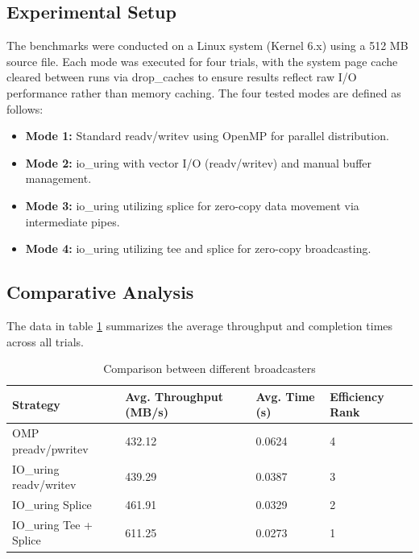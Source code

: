 \documentclass[
	a4paper,
	10pt,
	unnumberedsections,
	twoside, 
]{LTJournalArticle}
\begin{document}
\subsection{Experimental Setup}
The benchmarks were conducted on a Linux system (Kernel 6.x) using a 512 MB source file. Each mode was executed for four trials, with the system page cache cleared between runs via drop\_caches to ensure results reflect raw I/O performance rather than memory caching. The four tested modes are defined as follows:
\begin{itemize}
\item \textbf{Mode 1:} Standard readv/writev using OpenMP for parallel distribution.
\item \textbf{Mode 2:} io\_uring with vector I/O (readv/writev) and manual buffer management.
\item \textbf{Mode 3:} io\_uring utilizing splice for zero-copy data movement via intermediate pipes.
\item \textbf{Mode 4:} io\_uring utilizing tee and splice for zero-copy broadcasting.
\end{itemize}

\subsection{Comparative Analysis}
The data in table \ref{tab:comp_analysis} summarizes the average throughput and completion times across all trials.

\begin{table}[ht] %
	\centering
	\small %
	\begin{tabularx}{\textwidth}{|X|X|X|X|} %
		\hline
		\rowcolor{gray!10} %
		\textbf{Strategy} & \textbf{Avg. Throughput (MB/s)} & \textbf{Avg. Time (s)} & \textbf{Efficiency Rank} \\ \hline
		OMP preadv/pwritev & 432.12 & 0.0624 & 4 \\ \hline 
		IO\_uring readv/writev & 439.29 & 0.0387 & 3 \\ \hline
		IO\_uring Splice & 461.91 & 0.0329 & 2 \\ \hline
		IO\_uring Tee + Splice & 611.25 & 0.0273 & 1 \\ \hline
	\end{tabularx}
	\caption{Comparison between different broadcasters}
	\label{tab:comp_analysis}
\end{table}
\end{document}
